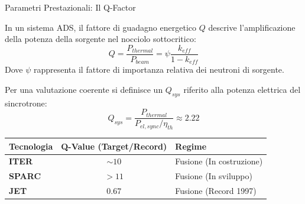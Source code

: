 \documentclass[aspectratio=169]{beamer} %
\begin{document}
\begin{frame}{Parametri Prestazionali: Il Q-Factor}
    
    In un sistema ADS, il fattore di guadagno energetico $Q$ descrive l'amplificazione della potenza della sorgente nel nocciolo sottocritico:
    \begin{equation*}
        Q = \frac{P_{thermal}}{P_{beam}} = \psi \frac{k_{eff}}{1 - k_{eff}}
    \end{equation*}
    Dove $\psi$ rappresenta il fattore di importanza relativa dei neutroni di sorgente.
    
    Per una valutazione coerente si definisce un $Q_{sys}$ riferito alla potenza elettrica del sincrotrone:
    \begin{equation*}
        Q_{sys} = \frac{P_{thermal}}{P_{el, sync} / \eta_{th}} \approx 2.22
    \end{equation*}

    \begin{table}
        \centering
        \small
        \begin{tabular}{l | c | l}
            \textbf{Tecnologia} & \textbf{Q-Value (Target/Record)} & \textbf{Regime} \\
            \hline
            \textbf{ITER} & $\sim 10$ & Fusione (In costruzione) \\
            \textbf{SPARC} & $> 11$ & Fusione (In sviluppo) \\
            \textbf{JET} & $0.67$ & Fusione (Record 1997) \\
        \end{tabular}
    \end{table}
\end{frame}
\end{document}
